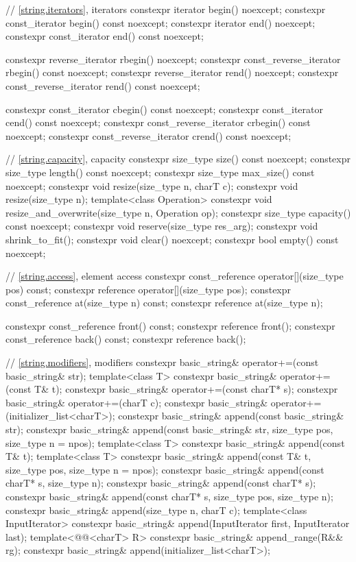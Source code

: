 \begin{codeblock}
{{    // \ref{string.iterators}, iterators
    constexpr iterator       begin() noexcept;
    constexpr const_iterator begin() const noexcept;
    constexpr iterator       end() noexcept;
    constexpr const_iterator end() const noexcept;

    constexpr reverse_iterator       rbegin() noexcept;
    constexpr const_reverse_iterator rbegin() const noexcept;
    constexpr reverse_iterator       rend() noexcept;
    constexpr const_reverse_iterator rend() const noexcept;

    constexpr const_iterator         cbegin() const noexcept;
    constexpr const_iterator         cend() const noexcept;
    constexpr const_reverse_iterator crbegin() const noexcept;
    constexpr const_reverse_iterator crend() const noexcept;

    // \ref{string.capacity}, capacity
    constexpr size_type size() const noexcept;
    constexpr size_type length() const noexcept;
    constexpr size_type max_size() const noexcept;
    constexpr void resize(size_type n, charT c);
    constexpr void resize(size_type n);
    template<class Operation> constexpr void resize_and_overwrite(size_type n, Operation op);
    constexpr size_type capacity() const noexcept;
    constexpr void reserve(size_type res_arg);
    constexpr void shrink_to_fit();
    constexpr void clear() noexcept;
    constexpr bool empty() const noexcept;

    // \ref{string.access}, element access
    constexpr const_reference operator[](size_type pos) const;
    constexpr reference       operator[](size_type pos);
    constexpr const_reference at(size_type n) const;
    constexpr reference       at(size_type n);

    constexpr const_reference front() const;
    constexpr reference       front();
    constexpr const_reference back() const;
    constexpr reference       back();

    // \ref{string.modifiers}, modifiers
    constexpr basic_string& operator+=(const basic_string& str);
    template<class T>
      constexpr basic_string& operator+=(const T& t);
    constexpr basic_string& operator+=(const charT* s);
    constexpr basic_string& operator+=(charT c);
    constexpr basic_string& operator+=(initializer_list<charT>);
    constexpr basic_string& append(const basic_string& str);
    constexpr basic_string& append(const basic_string& str, size_type pos, size_type n = npos);
    template<class T>
      constexpr basic_string& append(const T& t);
    template<class T>
      constexpr basic_string& append(const T& t, size_type pos, size_type n = npos);
    constexpr basic_string& append(const charT* s, size_type n);
    constexpr basic_string& append(const charT* s);
    constexpr basic_string& append(const charT* s, size_type pos, size_type n);
    constexpr basic_string& append(size_type n, charT c);
    template<class InputIterator>
      constexpr basic_string& append(InputIterator first, InputIterator last);
    template<@@<charT> R>
      constexpr basic_string& append_range(R&& rg);
    constexpr basic_string& append(initializer_list<charT>);

}}
\end{codeblock}
